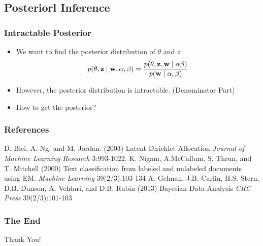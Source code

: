 \documentclass{beamer}
\begin{document}
\subsection{Posteriorl Inference}
\begin{frame}
\frametitle{Intractable Posterior}
\begin{itemize}
\item We want to find the posterior distribution of $\theta$ and $z$
$$p(\theta,{\bf z} \mid {\bf w}, \alpha, \beta) = \frac{p(\theta,{\bf z},{\bf w}\mid \alpha \beta)}{p({\bf w} \mid \alpha, \beta)}$$
\item However, the posterior distribution is intractable. (Denominator Part)
\item How to get the posterior? 
\end{itemize}
\end{frame}

\begin{frame}
\frametitle{References}
\footnotesize{
\begin{thebibliography}{99} %
 D. Blei, A. Ng, and M. Jordan. (2003)
\newblock Latent Dirichlet Allocation
\newblock \emph{Journal of Machine Learning Research} 3:993-1022.
 K. Nigam, A.McCallum, S. Thrun, and T. Mitchell (2000)
\newblock Text classification from labeled and unlabeled documents using EM.
\newblock \emph{Machine Learning} 39(2/3):103-134
 A. Gelman, J.B. Carlin, H.S. Stern, D.B. Dunson, A. Vehtari, and D.B. Rubin (2013)
\newblock Bayesian Data Analysis
\newblock \emph{CRC Press} 39(2/3):101-103
\end{thebibliography}
}
\end{frame}



\begin{frame}
\frametitle{The End}
\Huge{\centerline{Thank You!}}
\end{frame}

\end{document}
